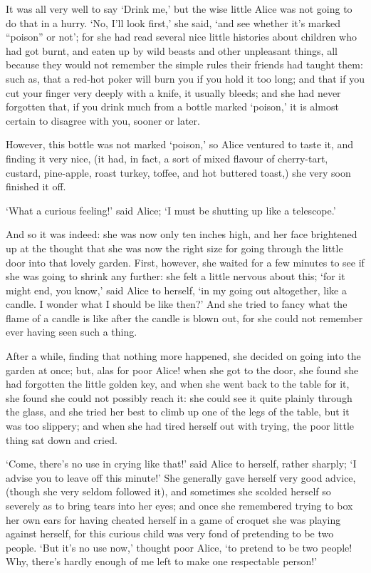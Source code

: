 \documentclass[statementpaper,twoside,openany]{memoir}
\begin{document}
It was all very well to say `Drink me,' but the wise little Alice was not going to do that in a hurry. `No, I'll look first,' she said, `and see whether it's marked ``poison'' or not'; for she had read several nice little histories about children who had got burnt, and eaten up by wild beasts and other unpleasant things, all because they would not remember the simple rules their friends had taught them: such as, that a red-hot poker will burn you if you hold it too long; and that if you cut your finger very deeply with a knife, it usually bleeds; and she had never forgotten that, if you drink much from a bottle marked `poison,' it is almost certain to disagree with you, sooner or later.

However, this bottle was not marked `poison,' so Alice ventured to taste it, and finding it very nice, (it had, in fact, a sort of mixed flavour of cherry-tart, custard, pine-apple, roast turkey, toffee, and hot buttered toast,) she very soon finished it off.

`What a curious feeling!' said Alice; `I must be shutting up like a telescope.'

And so it was indeed: she was now only ten inches high, and her face brightened up at the thought that she was now the right size for going through the little door into that lovely garden. First, however, she waited for a few minutes to see if she was going to shrink any further: she felt a little nervous about this; `for it might end, you know,' said Alice to herself, `in my going out altogether, like a candle. I wonder what I should be like then?' And she tried to fancy what the flame of a candle is like after the candle is blown out, for she could not remember ever having seen such a thing.

After a while, finding that nothing more happened, she decided on going into the garden at once; but, alas for poor Alice! when she got to the door, she found she had forgotten the little golden key, and when she went back to the table for it, she found she could not possibly reach it: she could see it quite plainly through the glass, and she tried her best to climb up one of the legs of the table, but it was too slippery; and when she had tired herself out with trying, the poor little thing sat down and cried.

`Come, there's no use in crying like that!' said Alice to herself, rather sharply; `I advise you to leave off this minute!' She generally gave herself very good advice, (though she very seldom followed it), and sometimes she scolded herself so severely as to bring tears into her eyes; and once she remembered trying to box her own ears for having cheated herself in a game of croquet she was playing against herself, for this curious child was very fond of pretending to be two people. `But it's no use now,' thought poor Alice, `to pretend to be two people! Why, there's hardly enough of me left to make one respectable person!'
\end{document}
